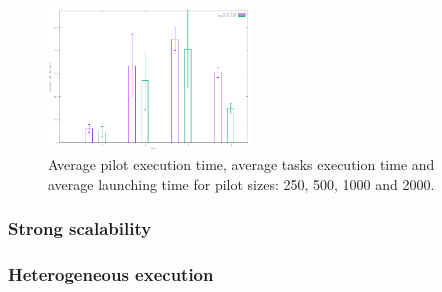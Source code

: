 \begin{figure}[!htb]
        \includegraphics[width=0.48\textwidth]{./figures/draft/AvgT.pdf}
    \caption{Average pilot execution time, average tasks execution time and average launching time for pilot sizes: 250, 500, 1000 and 2000.}
\label{fig:weakScal2}
\end{figure}

\subsubsection{Strong scalability}

\subsubsection{Heterogeneous execution}






%
%
